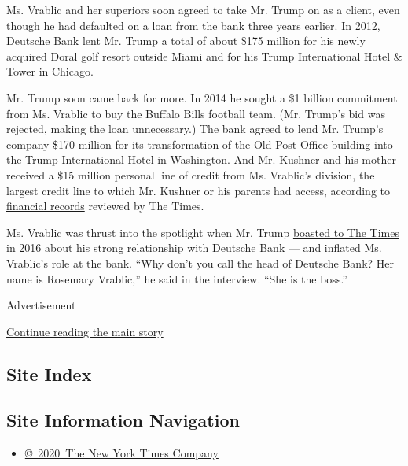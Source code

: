 Ms. Vrablic and her superiors soon agreed to take Mr. Trump on as a
client, even though he had defaulted on a loan from the bank three years
earlier. In 2012, Deutsche Bank lent Mr. Trump a total of about \$175
million for his newly acquired Doral golf resort outside Miami and for
his Trump International Hotel \& Tower in Chicago.

Mr. Trump soon came back for more. In 2014 he sought a \$1 billion
commitment from Ms. Vrablic to buy the Buffalo Bills football team. (Mr.
Trump's bid was rejected, making the loan unnecessary.) The bank agreed
to lend Mr. Trump's company \$170 million for its transformation of the
Old Post Office building into the Trump International Hotel in
Washington. And Mr. Kushner and his mother received a \$15 million
personal line of credit from Ms. Vrablic's division, the largest credit
line to which Mr. Kushner or his parents had access, according to
\href{https://www.nytimes3xbfgragh.onion/2018/10/13/business/jared-kushner-taxes.html}{financial
records} reviewed by The Times.

Ms. Vrablic was thrust into the spotlight when Mr. Trump
\href{https://www.nytimes3xbfgragh.onion/2016/05/24/business/dealbook/donald-trump-relationship-bankers.html}{boasted
to The Times} in 2016 about his strong relationship with Deutsche Bank
--- and inflated Ms. Vrablic's role at the bank. ``Why don't you call
the head of Deutsche Bank? Her name is Rosemary Vrablic,'' he said in
the interview. ``She is the boss.''

Advertisement

\protect\hyperlink{after-bottom}{Continue reading the main story}

\hypertarget{site-index}{%
\subsection{Site Index}\label{site-index}}

\hypertarget{site-information-navigation}{%
\subsection{Site Information
Navigation}\label{site-information-navigation}}

\begin{itemize}
\tightlist
\item
  \href{https://help.nytimes3xbfgragh.onion/hc/en-us/articles/115014792127-Copyright-notice}{©~2020~The
  New York Times Company}
\end{itemize}

